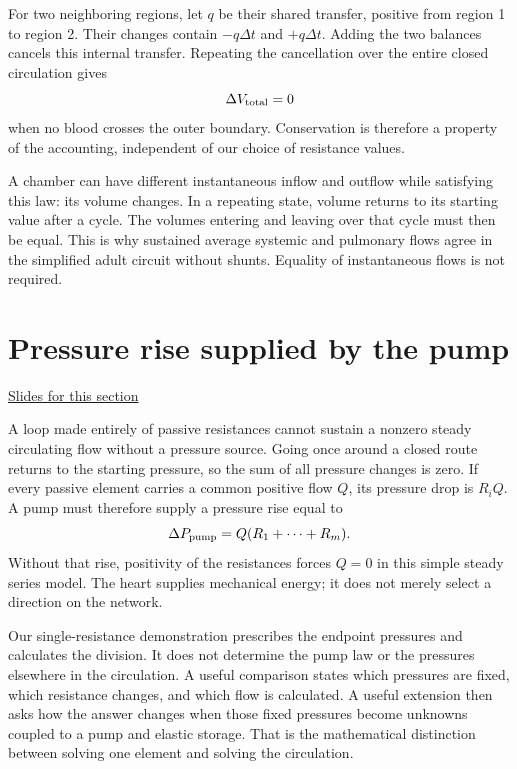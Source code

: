 \documentclass[11pt,letterpaper]{article}
\theoremstyle{definition}\newtheorem{definition}{Definition}\newtheorem{example}{Example}
\numberwithin{equation}{section}
\begin{document}
For two neighboring regions, let $q$ be their shared transfer, positive from region 1 to region 2. Their changes contain $-q\Delta t$ and $+q\Delta t$. Adding the two balances cancels this internal transfer. Repeating the cancellation over the entire closed circulation gives
\[
\Delta V_{\rm total}=0
\]
when no blood crosses the outer boundary. Conservation is therefore a property of the accounting, independent of our choice of resistance values.

A chamber can have different instantaneous inflow and outflow while satisfying this law: its volume changes. In a repeating state, volume returns to its starting value after a cycle. The volumes entering and leaving over that cycle must then be equal. This is why sustained average systemic and pulmonary flows agree in the simplified adult circuit without shunts. Equality of instantaneous flows is not required.
\section{Pressure rise supplied by the pump}
\hypertarget{note-pressure-rise-supplied-by-the-pump}{}\label{note:pressure-rise-supplied-by-the-pump}
{\small \href{slides.html\#frame=why-the-loop-needs-a-pump\&step=1}{Slides for this section}}\par
A loop made entirely of passive resistances cannot sustain a nonzero steady circulating flow without a pressure source. Going once around a closed route returns to the starting pressure, so the sum of all pressure changes is zero. If every passive element carries a common positive flow $Q$, its pressure drop is $R_iQ$. A pump must therefore supply a pressure rise equal to
\[
\Delta P_{\rm pump}=Q(R_1+\cdots+R_m).
\]
Without that rise, positivity of the resistances forces $Q=0$ in this simple steady series model. The heart supplies mechanical energy; it does not merely select a direction on the network.

Our single-resistance demonstration prescribes the endpoint pressures and calculates the division. It does not determine the pump law or the pressures elsewhere in the circulation. A useful comparison states which pressures are fixed, which resistance changes, and which flow is calculated. A useful extension then asks how the answer changes when those fixed pressures become unknowns coupled to a pump and elastic storage. That is the mathematical distinction between solving one element and solving the circulation.
\bigskip
\end{document}
